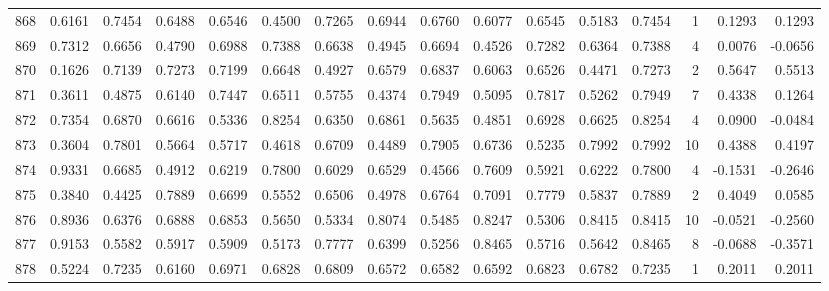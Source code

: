 \begin{tabular}{lrrrrrrrrrrrrrrr}
868 &      0.6161 &  0.7454 &  0.6488 &  0.6546 &  0.4500 &  0.7265 &  0.6944 &  0.6760 &  0.6077 &  0.6545 &   0.5183 &     0.7454 &      1 &                    0.1293 &                     0.1293 \\
869 &      0.7312 &  0.6656 &  0.4790 &  0.6988 &  0.7388 &  0.6638 &  0.4945 &  0.6694 &  0.4526 &  0.7282 &   0.6364 &     0.7388 &      4 &                    0.0076 &                    -0.0656 \\
870 &      0.1626 &  0.7139 &  0.7273 &  0.7199 &  0.6648 &  0.4927 &  0.6579 &  0.6837 &  0.6063 &  0.6526 &   0.4471 &     0.7273 &      2 &                    0.5647 &                     0.5513 \\
871 &      0.3611 &  0.4875 &  0.6140 &  0.7447 &  0.6511 &  0.5755 &  0.4374 &  0.7949 &  0.5095 &  0.7817 &   0.5262 &     0.7949 &      7 &                    0.4338 &                     0.1264 \\
872 &      0.7354 &  0.6870 &  0.6616 &  0.5336 &  0.8254 &  0.6350 &  0.6861 &  0.5635 &  0.4851 &  0.6928 &   0.6625 &     0.8254 &      4 &                    0.0900 &                    -0.0484 \\
873 &      0.3604 &  0.7801 &  0.5664 &  0.5717 &  0.4618 &  0.6709 &  0.4489 &  0.7905 &  0.6736 &  0.5235 &   0.7992 &     0.7992 &     10 &                    0.4388 &                     0.4197 \\
874 &      0.9331 &  0.6685 &  0.4912 &  0.6219 &  0.7800 &  0.6029 &  0.6529 &  0.4566 &  0.7609 &  0.5921 &   0.6222 &     0.7800 &      4 &                   -0.1531 &                    -0.2646 \\
875 &      0.3840 &  0.4425 &  0.7889 &  0.6699 &  0.5552 &  0.6506 &  0.4978 &  0.6764 &  0.7091 &  0.7779 &   0.5837 &     0.7889 &      2 &                    0.4049 &                     0.0585 \\
876 &      0.8936 &  0.6376 &  0.6888 &  0.6853 &  0.5650 &  0.5334 &  0.8074 &  0.5485 &  0.8247 &  0.5306 &   0.8415 &     0.8415 &     10 &                   -0.0521 &                    -0.2560 \\
877 &      0.9153 &  0.5582 &  0.5917 &  0.5909 &  0.5173 &  0.7777 &  0.6399 &  0.5256 &  0.8465 &  0.5716 &   0.5642 &     0.8465 &      8 &                   -0.0688 &                    -0.3571 \\
878 &      0.5224 &  0.7235 &  0.6160 &  0.6971 &  0.6828 &  0.6809 &  0.6572 &  0.6582 &  0.6592 &  0.6823 &   0.6782 &     0.7235 &      1 &                    0.2011 &                     0.2011 \\

\end{tabular}
